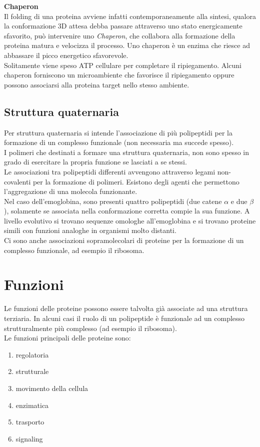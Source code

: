             \textbf{Chaperon}\\
                Il folding di una proteina avviene infatti contemporaneamente alla sintesi, qualora la conformazione 3D attesa debba passare attraverso uno stato energicamente sfavorito, può intervenire uno \textit{Chaperon}, che collabora alla formazione della proteina matura e velocizza il processo. 
                Uno chaperon è un enzima che riesce ad abbassare il picco energetico sfavorevole.\\
                Solitamente viene speso ATP cellulare per completare il ripiegamento. Alcuni chaperon forniscono un microambiente che favorisce il ripiegamento oppure possono associarsi alla proteina target nello stesso ambiente.
        
    \subsection{Struttura quaternaria}
        Per struttura quaternaria si intende l'associazione di più polipeptidi per la formazione di un complesso funzionale (non necessaria ma succede spesso).\\
        I polimeri che destinati a formare una struttura quaternaria, non sono spesso in grado di esercitare la propria funzione se lasciati a se stessi.\\
        Le associazioni tra polipeptidi differenti avvengono attraverso legami non-covalenti per la formazione di polimeri. Esistono degli agenti che permettono l'aggregazione di una molecola funzionante.\\
        Nel caso dell'emoglobina, sono presenti quattro polipeptidi (due catene $\alpha$ e due $\beta$), solamente se associata nella conformazione corretta compie la sua funzione. A livello evolutivo si trovano sequenze omologhe all'emoglobina e si trovano proteine simili con funzioni analoghe in organismi molto distanti.\\
        Ci sono anche associazioni sopramolecolari di proteine per la formazione di un complesso funzionale, ad esempio il ribosoma.
    
\section{Funzioni}
    Le funzioni delle proteine possono essere talvolta già associate ad una struttura terziaria. In alcuni casi il ruolo di un polipeptide è funzionale ad un complesso strutturalmente più complesso (ad esempio il ribosoma). \\
    Le funzioni principali delle proteine sono:
    \begin{enumerate}
        \item regolatoria
        \item strutturale
        \item movimento della cellula
        \item enzimatica
        \item trasporto
        \item signaling
    \end{enumerate}
    
\pagebreak